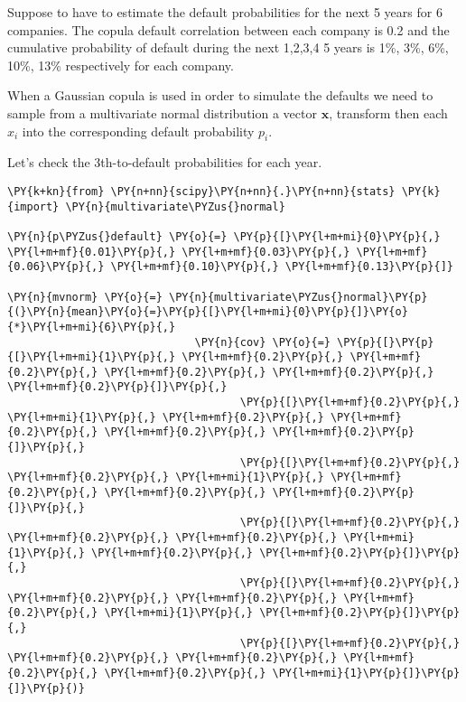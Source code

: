 Suppose to have to estimate the default probabilities for the next 5 years for 6 companies. 
The copula default correlation between each company is 0.2 and the cumulative probability of default during the next 1,2,3,4 5 years is 1\%, 3\%, 6\%, 10\%, 13\% respectively for each company.

When a Gaussian copula is used in order to simulate the defaults we need to sample from a multivariate normal distribution a vector $\mathbf{x}$, transform then each $x_i$ into the corresponding default probability $p_i$.

Let's check the 3th-to-default probabilities for each year.
\begin{tcolorbox}[breakable, size=fbox, boxrule=1pt, pad at break*=1mm,colback=cellbackground, colframe=cellborder]
\begin{Verbatim}[commandchars=\\\{\}]
\PY{k+kn}{from} \PY{n+nn}{scipy}\PY{n+nn}{.}\PY{n+nn}{stats} \PY{k}{import} \PY{n}{multivariate\PYZus{}normal}
	
\PY{n}{p\PYZus{}default} \PY{o}{=} \PY{p}{[}\PY{l+m+mi}{0}\PY{p}{,} \PY{l+m+mf}{0.01}\PY{p}{,} \PY{l+m+mf}{0.03}\PY{p}{,} \PY{l+m+mf}{0.06}\PY{p}{,} \PY{l+m+mf}{0.10}\PY{p}{,} \PY{l+m+mf}{0.13}\PY{p}{]}
	
\PY{n}{mvnorm} \PY{o}{=} \PY{n}{multivariate\PYZus{}normal}\PY{p}{(}\PY{n}{mean}\PY{o}{=}\PY{p}{[}\PY{l+m+mi}{0}\PY{p}{]}\PY{o}{*}\PY{l+m+mi}{6}\PY{p}{,}
                             \PY{n}{cov} \PY{o}{=} \PY{p}{[}\PY{p}{[}\PY{l+m+mi}{1}\PY{p}{,} \PY{l+m+mf}{0.2}\PY{p}{,} \PY{l+m+mf}{0.2}\PY{p}{,} \PY{l+m+mf}{0.2}\PY{p}{,} \PY{l+m+mf}{0.2}\PY{p}{,} \PY{l+m+mf}{0.2}\PY{p}{]}\PY{p}{,}
                                    \PY{p}{[}\PY{l+m+mf}{0.2}\PY{p}{,} \PY{l+m+mi}{1}\PY{p}{,} \PY{l+m+mf}{0.2}\PY{p}{,} \PY{l+m+mf}{0.2}\PY{p}{,} \PY{l+m+mf}{0.2}\PY{p}{,} \PY{l+m+mf}{0.2}\PY{p}{]}\PY{p}{,}
                                    \PY{p}{[}\PY{l+m+mf}{0.2}\PY{p}{,} \PY{l+m+mf}{0.2}\PY{p}{,} \PY{l+m+mi}{1}\PY{p}{,} \PY{l+m+mf}{0.2}\PY{p}{,} \PY{l+m+mf}{0.2}\PY{p}{,} \PY{l+m+mf}{0.2}\PY{p}{]}\PY{p}{,}
                                    \PY{p}{[}\PY{l+m+mf}{0.2}\PY{p}{,} \PY{l+m+mf}{0.2}\PY{p}{,} \PY{l+m+mf}{0.2}\PY{p}{,} \PY{l+m+mi}{1}\PY{p}{,} \PY{l+m+mf}{0.2}\PY{p}{,} \PY{l+m+mf}{0.2}\PY{p}{]}\PY{p}{,}
                                    \PY{p}{[}\PY{l+m+mf}{0.2}\PY{p}{,} \PY{l+m+mf}{0.2}\PY{p}{,} \PY{l+m+mf}{0.2}\PY{p}{,} \PY{l+m+mf}{0.2}\PY{p}{,} \PY{l+m+mi}{1}\PY{p}{,} \PY{l+m+mf}{0.2}\PY{p}{]}\PY{p}{,}
                                    \PY{p}{[}\PY{l+m+mf}{0.2}\PY{p}{,} \PY{l+m+mf}{0.2}\PY{p}{,} \PY{l+m+mf}{0.2}\PY{p}{,} \PY{l+m+mf}{0.2}\PY{p}{,} \PY{l+m+mf}{0.2}\PY{p}{,} \PY{l+m+mi}{1}\PY{p}{]}\PY{p}{]}\PY{p}{)}
	

\end{Verbatim}
\end{tcolorbox}
